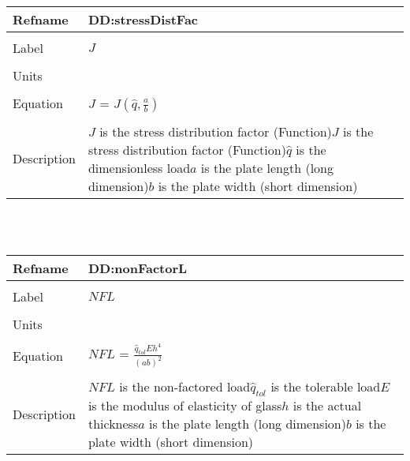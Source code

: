 \documentclass[12pt]{article}
\begin{document}
~\newline
\noindent \begin{minipage}{\textwidth}
\begin{tabular}{p{} p{}}
\toprule \textbf{Refname} & \textbf{DD:stressDistFac}
\label{DD:stressDistFac}
\\ \midrule \\
Label & $J$
\\ \midrule \\
Units & 
\\ \midrule \\
Equation & $J$ = $J(\hat{q},\frac{a}{b})$
\\ \midrule \\
Description & $J$ is the stress distribution factor (Function)\newline$J$ is the stress distribution factor (Function)\newline$\hat{q}$ is the dimensionless load\newline$a$ is the plate length (long dimension)\newline$b$ is the plate width (short dimension)
\\ \bottomrule \end{tabular}
\end{minipage}\\
~\newline
\noindent \begin{minipage}{\textwidth}
\begin{tabular}{p{} p{}}
\toprule \textbf{Refname} & \textbf{DD:nonFactorL}
\label{DD:nonFactorL}
\\ \midrule \\
Label & $NFL$
\\ \midrule \\
Units & 
\\ \midrule \\
Equation & $NFL$ = $\frac{\hat{q}_{tol}Eh^{4}}{(ab)^{2}}$
\\ \midrule \\
Description & $NFL$ is the non-factored load\newline$\hat{q}_{tol}$ is the tolerable load\newline$E$ is the modulus of elasticity of glass\newline$h$ is the actual thickness\newline$a$ is the plate length (long dimension)\newline$b$ is the plate width (short dimension)
\\ \bottomrule \end{tabular}
\end{minipage}\\
\end{document}
